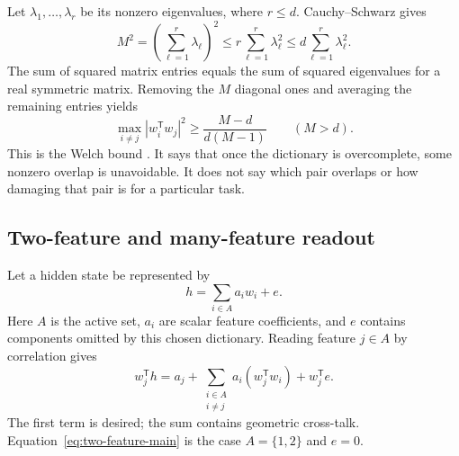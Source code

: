 \documentclass[
  aps,
  reprint,
  superscriptaddress,
  floatfix,
  nofootinbib,
  longbibliography
]{revtex4-2}
\newcommand{\T}{^{\mathsf T}}
\begin{document}
Let $\lambda_1,\ldots,\lambda_r$ be its nonzero eigenvalues, where $r\leq d$.
Cauchy--Schwarz gives
\begin{equation}
 M^2=\left(\sum_{\ell=1}^r\lambda_\ell\right)^2
 \leq r\sum_{\ell=1}^r\lambda_\ell^2
 \leq d\sum_{\ell=1}^r\lambda_\ell^2.
 \label{eq:eigen-cs-app}
\end{equation}
The sum of squared matrix entries equals the sum of squared eigenvalues for a
real symmetric matrix.  Removing the $M$ diagonal ones and averaging the
remaining entries yields
\begin{equation}
 \max_{i\ne j}|w_i\T w_j|^2
 \geq \frac{M-d}{d(M-1)}
 \qquad (M>d).
 \label{eq:welch-app}
\end{equation}
This is the Welch bound \cite{welch1974coherence}.  It says that once the
dictionary is overcomplete, some nonzero overlap is unavoidable.  It does not
say which pair overlaps or how damaging that pair is for a particular task.

\subsection{Two-feature and many-feature readout}

Let a hidden state be represented by
\begin{equation}
 h=\sum_{i\in A}a_iw_i+e.
 \label{eq:feature-code-app}
\end{equation}
Here $A$ is the active set, $a_i$ are scalar feature coefficients, and $e$ contains
components omitted by this chosen dictionary.  Reading feature $j\in A$ by
correlation gives
\begin{equation}
 w_j\T h
 =a_j+\sum_{\substack{i\in A\\i\ne j}}
 a_i(w_j\T w_i)+w_j\T e.
 \label{eq:readout-app}
\end{equation}
The first term is desired; the sum contains geometric cross-talk.
Equation~\eqref{eq:two-feature-main} is the case $A=\{1,2\}$ and $e=0$.
\end{document}
